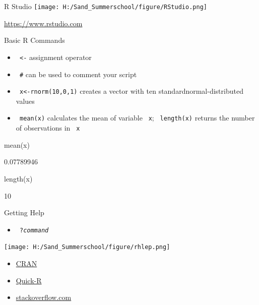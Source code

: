 \documentclass[11pt,german,hideothersubsections]{beamer}
\newcommand{\R}[1]{{\tt \color{blue}  #1}}
\begin{document}
\begin{frame}[fragile]{R Studio}
\texttt{[image: H:/Sand\_Summerschool/figure/RStudio.png]}
\vspace{.5cm}
\begin{center}
\url{https://www.rstudio.com}
\end{center}
\end{frame}
\begin{frame}[fragile]{Basic R Commands}
\begin{itemize}
\item \R{<-}  assignment operator
\item \R{\#} can be used to comment your script
\item \R{x<-rnorm(10,0,1)} creates a vector with ten standardnormal-distributed values
\item \R{mean(x)} calculates the mean of variable \R{x}; \R{length(x)} returns the number of observations in \R{x}
\end{itemize}
\begin{Schunk}
\begin{Sinput}
 mean(x)
\end{Sinput}
\begin{Soutput}
[1] 0.07789946
\end{Soutput}
\begin{Sinput}
 length(x)
\end{Sinput}
\begin{Soutput}
[1] 10
\end{Soutput}
\end{Schunk}
\end{frame}
\begin{frame}[fragile]{Getting Help}
\begin{itemize}
\item \R{?\emph{command}}
\end{itemize}
\texttt{[image: H:/Sand\_Summerschool/figure/rhlep.png]}
\begin{itemize}
\item \href{https://cran.r-project.org}{CRAN}
\item \href{http://www.statmethods.net}{Quick-R}
\item \href{http://stackoverflow.com/questions/tagged/r}{stackoverflow.com}
\end{itemize}

\end{frame}
\end{document}
